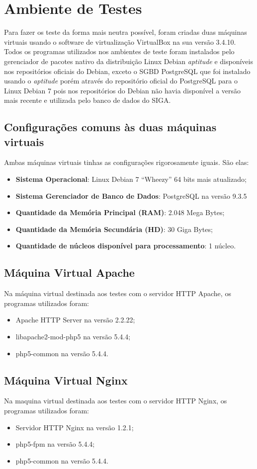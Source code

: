 \section{Ambiente de Testes}

Para fazer os teste da forma mais neutra possível, foram criadas duas máquinas virtuais usando o software de virtualização VirtualBox na sua versão 3.4.10.\\
Todos os programas utilizados nos ambientes de teste foram instalados pelo gerenciador de pacotes nativo da distribuição Linux Debian \textit{aptitude} e disponíveis nos repositórios oficiais do Debian, exceto o SGBD PostgreSQL que foi instalado usando o \textit{aptitude} porém através do repositório oficial do PostgreSQL para o Linux Debian 7 pois nos repositórios do Debian não havia disponível a versão mais recente e utilizada pelo banco de dados do SIGA.

\subsection{Configurações comuns às duas máquinas virtuais}
 Ambas máquinas virtuais tinhas as configurações rigorosamente iguais. São elas:
\begin{itemize}
\item \textbf{Sistema Operacional}: Linux Debian 7 “Wheezy” 64 bits mais atualizado;
\item \textbf{Sistema Gerenciador de Banco de Dados}: PostgreSQL na versão 9.3.5
\item \textbf{Quantidade da Memória Principal (RAM)}: 2.048 Mega Bytes;
\item \textbf{Quantidade da Memória Secundária (HD)}: 30 Giga Bytes;
\item \textbf{Quantidade de núcleos disponível para processamento}: 1 núcleo.
\end{itemize}

\subsection{Máquina Virtual Apache}
Na máquina virtual destinada aos testes com o servidor HTTP Apache, os programas utilizados foram:
\begin{itemize}
\item Apache HTTP Server na versão 2.2.22;
\item libapache2-mod-php5 na versão 5.4.4;
\item php5-common na versão 5.4.4.
\end{itemize}

\subsection{Máquina Virtual Nginx}
Na maquina virtual destinada aos testes com o servidor HTTP Nginx, os programas utilizados foram:

\begin{itemize}
\item Servidor HTTP Nginx na versão 1.2.1;
\item php5-fpm na versão 5.4.4;
\item php5-common na versão 5.4.4.
\end{itemize}

